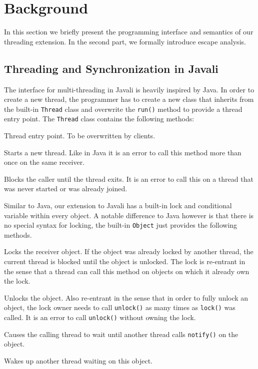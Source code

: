 \documentclass[letterpaper]{article}
\begin{document}

\section{Background}\label{sec:background}

In this section we briefly present the programming interface and semantics of our
threading extension. In the second part, we formally introduce escape analysis.

\subsection{Threading and Synchronization in Javali}
The interface for multi-threading in Javali is heavily inspired by Java. In
order to create a new thread, the programmer has to create a new class that
inherits from the built-in \texttt{Thread} class and overwrite the \texttt{run()}
method to provide a thread entry point. 
The \texttt{Thread} class contains the following methods:

\begin{description}[leftmargin=!,labelwidth=\widthof{\texttt{start()}}]
 \item[\texttt{run()}] Thread entry point. To be overwritten by clients.
 \item[\texttt{start()}] Starts a new thread. Like in Java it is an error to
 call this method more than once on the same receiver.
 \item[\texttt{join()}] Blocks the caller until the thread exits. It is an error
 to call this on a thread that was never started or was already joined.
\end{description}

Similar to Java, our extension to Javali has a built-in lock and conditional variable
within every object. A notable difference to Java however is that there is
no special syntax for locking, the built-in \texttt{Object} just provides the
following methods.

\begin{description}[leftmargin=!,labelwidth=\widthof{\texttt{unlock()}}]
 \item[\texttt{lock()}] Locks the receiver object. If the object was already locked by
 another thread, the current thread is blocked until the object is unlocked. The
 lock is re-entrant in the sense that a thread can call this method on objects
 on which it already own the lock.
 \item[\texttt{unlock()}] Unlocks the object. Also re-entrant in the sense that
 in order to fully unlock an object,
 the lock owner needs to call \texttt{unlock()} as many times as \texttt{lock()}
 was called. It is an error to call \texttt{unlock()} without owning the lock.
 \item[\texttt{wait()}] Causes the calling thread to wait until another thread
 calls \texttt{notify()} on the object.
 \item[\texttt{notify()}] Wakes up another thread waiting on this object.
\end{description} %
\end{document}
